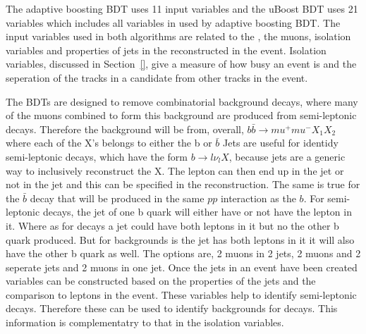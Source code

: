 The adaptive boosting BDT uses 11 input variables and the uBoost BDT uses 21 variables which includes all variables in used by adaptive boosting BDT.
The input variables used in both algorithms are related to the \bs, the muons, isolation variables and properties of jets in the reconstructed in the event. Isolation variables, discussed in Section~\ref{}, give a measure of how busy an event is and the seperation of the tracks in a \bsmumu candidate from other tracks in the event. 


The BDTs are designed to remove combinatorial background decays, where many of the muons combined to form this background are produced from semi-leptonic decays. 
Therefore the background will be from, overall, $b\bar{b} \to mu^{+} mu^{-} X_{1} X_{2}$ where each of the X's belongs to either the b or $\bar{b}$
Jets are useful for identidy semi-leptonic decays, which have the form $b \to l\nu_{l} X$, because jets are a generic way to inclusively reconstruct the X. The lepton can then end up in the jet or not in the jet and this can be specified in the reconstruction. The same is true for the $\bar{b}$ decay that will be produced in the same $pp$ interaction as the $b$.
For semi-leptonic decays, the jet of one b quark will either have or not have the lepton in it.
Where as for \bsmumu decays a jet could have both leptons in it but no the other b quark produced. But for backgrounds is the jet has both leptons in it it will also have the other b quark as well.
The options are, 2 muons in 2 jets, 2 muons and 2 seperate jets and 2 muons in one jet.
Once the jets in an event have been created variables can be constructed based on the properties of the jets and the comparison to leptons in the event. These variables help to identify semi-leptonic decays. Therefore these can be used to identify backgrounds for \bsmumu decays. This information is complementatry to that in the isolation variables.

